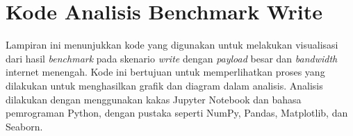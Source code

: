 \chapter{Kode Analisis Benchmark Write}
\label{appendix:write-benchmark-code}

Lampiran ini menunjukkan kode yang digunakan untuk melakukan visualisasi dari hasil \textit{benchmark} pada skenario \textit{write} dengan \textit{payload} besar dan \textit{bandwidth} internet menengah. Kode ini bertujuan untuk memperlihatkan proses yang dilakukan untuk menghasilkan grafik dan diagram dalam analisis. Analisis dilakukan dengan menggunakan kakas Jupyter Notebook dan bahasa pemrograman Python, dengan pustaka seperti NumPy, Pandas, Matplotlib, dan Seaborn.

